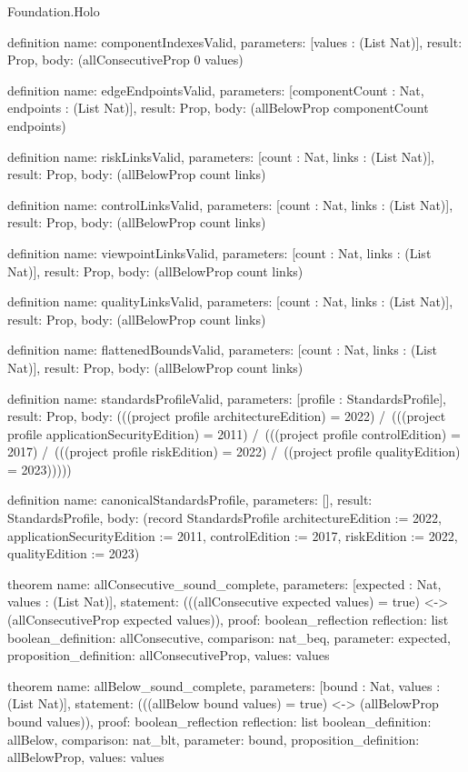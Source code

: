 \begin{lexlean}{Foundation.Holo}
\begin{semanticmodule}
definition{
  name: componentIndexesValid,
  parameters: [values : (List Nat)],
  result: Prop,
  body: (allConsecutiveProp 0 values)
}

definition{
  name: edgeEndpointsValid,
  parameters: [componentCount : Nat, endpoints : (List Nat)],
  result: Prop,
  body: (allBelowProp componentCount endpoints)
}

definition{
  name: riskLinksValid,
  parameters: [count : Nat, links : (List Nat)],
  result: Prop,
  body: (allBelowProp count links)
}

definition{
  name: controlLinksValid,
  parameters: [count : Nat, links : (List Nat)],
  result: Prop,
  body: (allBelowProp count links)
}

definition{
  name: viewpointLinksValid,
  parameters: [count : Nat, links : (List Nat)],
  result: Prop,
  body: (allBelowProp count links)
}

definition{
  name: qualityLinksValid,
  parameters: [count : Nat, links : (List Nat)],
  result: Prop,
  body: (allBelowProp count links)
}

definition{
  name: flattenedBoundsValid,
  parameters: [count : Nat, links : (List Nat)],
  result: Prop,
  body: (allBelowProp count links)
}

definition{
  name: standardsProfileValid,
  parameters: [profile : StandardsProfile],
  result: Prop,
  body: (((project profile architectureEdition) = 2022) /\ (((project profile applicationSecurityEdition) = 2011) /\ (((project profile controlEdition) = 2017) /\ (((project profile riskEdition) = 2022) /\ ((project profile qualityEdition) = 2023)))))
}

definition{
  name: canonicalStandardsProfile,
  parameters: [],
  result: StandardsProfile,
  body: (record StandardsProfile {architectureEdition := 2022, applicationSecurityEdition := 2011, controlEdition := 2017, riskEdition := 2022, qualityEdition := 2023})
}

theorem{
  name: allConsecutive_sound_complete,
  parameters: [expected : Nat, values : (List Nat)],
  statement: (((allConsecutive expected values) = true) <-> (allConsecutiveProp expected values)),
  proof: boolean_reflection{
    reflection: list{
      boolean_definition: allConsecutive,
      comparison: nat_beq,
      parameter: expected,
      proposition_definition: allConsecutiveProp,
      values: values
    }
  }
}

theorem{
  name: allBelow_sound_complete,
  parameters: [bound : Nat, values : (List Nat)],
  statement: (((allBelow bound values) = true) <-> (allBelowProp bound values)),
  proof: boolean_reflection{
    reflection: list{
      boolean_definition: allBelow,
      comparison: nat_blt,
      parameter: bound,
      proposition_definition: allBelowProp,
      values: values
    }
  }
}


\end{semanticmodule}
\end{lexlean}
